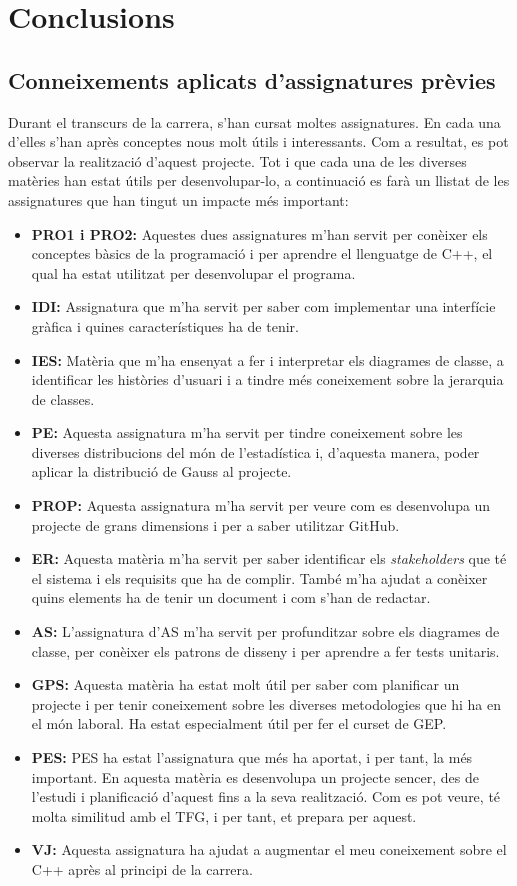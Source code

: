 \documentclass[a4paper]{article}
\begin{document}
\newpage
\section{Conclusions}
\subsection{Conneixements aplicats d'assignatures prèvies}
Durant el transcurs de la carrera, s'han cursat moltes assignatures. En cada una d'elles s'han après conceptes nous molt útils i interessants. Com a resultat, es pot observar la realització d'aquest projecte. Tot i que cada una de les diverses matèries han estat útils per desenvolupar-lo, a continuació es farà un llistat de les assignatures que han tingut un impacte més important:

\begin{itemize}
    \item \textbf{PRO1 i PRO2:} Aquestes dues assignatures m'han servit per conèixer els conceptes bàsics de la programació i per aprendre el llenguatge de C++, el qual ha estat utilitzat per desenvolupar el programa.
    \item \textbf{IDI:} Assignatura que m'ha servit per saber com implementar una interfície gràfica i quines característiques ha de tenir.
    \item \textbf{IES:} Matèria que m'ha ensenyat a fer i interpretar els diagrames de classe, a identificar les històries d'usuari i a tindre més coneixement sobre la jerarquia de classes.
    \item \textbf{PE:} Aquesta assignatura m'ha servit per tindre coneixement sobre les diverses distribucions del món de l'estadística i, d'aquesta manera, poder aplicar la distribució de Gauss al projecte.
    \item \textbf{PROP:} Aquesta assignatura m'ha servit per veure com es desenvolupa un projecte de grans dimensions i per a saber utilitzar GitHub.
    \item \textbf{ER:} Aquesta matèria m'ha servit per saber identificar els \textit{stakeholders} que té el sistema i els requisits que ha de complir. També m'ha ajudat a conèixer quins elements ha de tenir un document i com s'han de redactar.
    \item \textbf{AS:} L'assignatura d'AS m'ha servit per profunditzar sobre els diagrames de classe, per conèixer els patrons de disseny i per aprendre a fer tests unitaris.
    \item\textbf{GPS:} Aquesta matèria ha estat molt útil per saber com planificar un projecte i per tenir coneixement sobre les diverses metodologies que hi ha en el món laboral. Ha estat especialment útil per fer el curset de GEP.
    \item \textbf{PES:} PES ha estat l'assignatura que més ha aportat, i per tant, la més important. En aquesta matèria es desenvolupa un projecte sencer, des de l'estudi i planificació d'aquest fins a la seva realització. Com es pot veure, té molta similitud amb el TFG, i per tant, et prepara per aquest.
    \item \textbf{VJ:} Aquesta assignatura ha ajudat a augmentar el meu coneixement sobre el C++ après al principi de la carrera.
\end{itemize}
\end{document}
